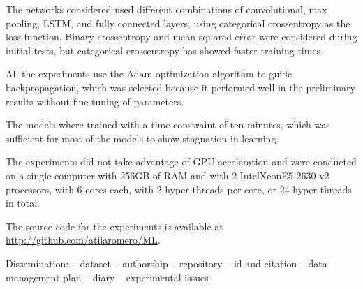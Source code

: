 The networks considered used different combinations of convolutional, max pooling, LSTM, and fully connected layers,
using categorical crossentropy as the loss function. Binary crossentropy and mean squared error were considered during initial tests, but categorical crossentropy has showed faster training times.

All the experiments use the Adam \cite{kingma_adam:_2014}
optimization algorithm to guide backpropagation, which was selected because it performed well in the preliminary results without fine tuning of parameters.

The models where trained with a time constraint of ten minutes, which was sufficient for most of the models to show stagnation in learning.

The experiments did not take advantage of GPU acceleration and were  conducted on a single computer with 256GB of RAM and with 2 Intel\textregistered Xeon\textregistered E5-2630 v2 processors, with 6 cores each, with 2 hyper-threads per core, or 24 hyper-threads in total. 



The source code for the experiments is available at \url{http://github.com/atilaromero/ML}.










Dissemination:
-- dataset
-- authorship
-- repository
-- id and citation
-- data management plan
-- diary
-- experimental issues
